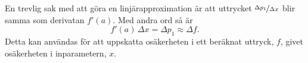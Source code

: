 \documentclass[11pt,a4paper, swedish
]{article}
\begin{document}
En trevlig sak med att göra en linjärapproximation är att uttrycket
$\nicefrac{\Delta{p_1}}{\Delta{x}}$ blir samma som derivatan
$f'(a)$. Med andra ord så är 
\begin{equation}
f'(a)\,\Delta{x} = \Delta{p_1} \approx \Delta{f}.
\end{equation}
Detta kan användas för att uppskatta osäkerheten i ett beräknat uttryck,
$f$, givet osäkerheten i inparametern, $x$.
\end{document}
